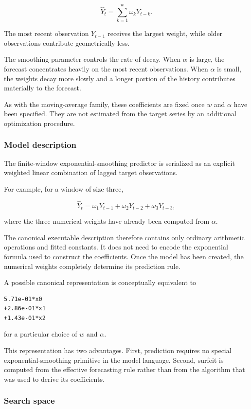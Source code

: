 \[
\widehat Y_t
=
\sum_{k=1}^{w}
\omega_kY_{t-k}.
\]

The most recent observation \(Y_{t-1}\) receives the largest weight, while older
observations contribute geometrically less.

The smoothing parameter controls the rate of decay. When \(\alpha\) is large,
the forecast concentrates heavily on the most recent observations. When
\(\alpha\) is small, the weights decay more slowly and a longer portion of the
history contributes materially to the forecast.

As with the moving-average family, these coefficients are fixed once \(w\) and
\(\alpha\) have been specified. They are not estimated from the target series by
an additional optimization procedure.

\subsubsection{Model description}

The finite-window exponential-smoothing predictor is serialized as an explicit
weighted linear combination of lagged target observations.

For example, for a window of size three,

\[
\widehat Y_t
=
\omega_1Y_{t-1}
+
\omega_2Y_{t-2}
+
\omega_3Y_{t-3},
\]

where the three numerical weights have already been computed from
\(\alpha\).

The canonical executable description therefore contains only ordinary
arithmetic operations and fitted constants. It does not need to encode the
exponential formula used to construct the coefficients. Once the model has been
created, the numerical weights completely determine its prediction rule.

A possible canonical representation is conceptually equivalent to

\begin{verbatim}
5.71e-01*x0
+2.86e-01*x1
+1.43e-01*x2
\end{verbatim}

for a particular choice of \(w\) and \(\alpha\).

This representation has two advantages. First, prediction requires no special
exponential-smoothing primitive in the model language. Second, surfeit is
computed from the effective forecasting rule rather than from the algorithm that
was used to derive its coefficients.

\subsubsection{Search space}

